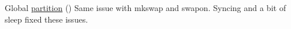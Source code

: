 
\begin{DoxyRefList}
\item[Global \mbox{\hyperlink{group__mk_file_system_gaa9952b2711fe0413d7a0bc6639c7f5a5}{partition}} ()]\label{bug__bug000001}%
%
Same issue with mkswap and swapon. Syncing and a bit of sleep fixed these issues. 
\end{DoxyRefList}